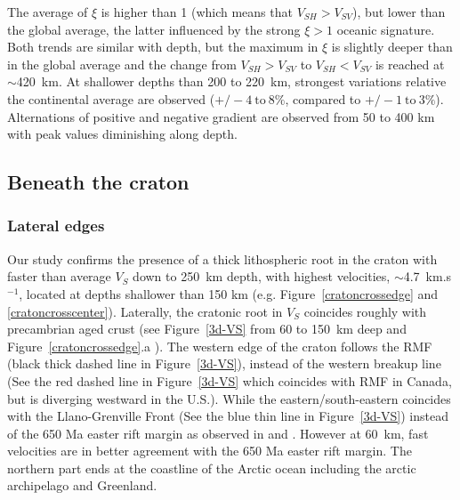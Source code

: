 \documentclass[12pt]{article}
\begin{document}
		The average of $\xi$ is higher than 1 (which means that $V_{SH} > V_{SV}$), but lower than the global average, the latter influenced by the strong $\xi > 1$ oceanic signature. 
		Both trends are similar with depth, but the maximum in $\xi$ is slightly deeper than in the global average and the change from $V_{SH} > V_{SV}$ to $V_{SH} < V_{SV}$ is reached at $\sim$420~km. 
		At shallower depths than 200 to 220~km, strongest variations relative the continental average are observed ($+/- 4 \: \text{to} \: 8 \%$, compared to $+/- 1 \: \text{to} \: 3 \%$). 
		Alternations of positive and negative gradient are observed from 50 to 400 km with peak values diminishing along depth. 


	\subsection{Beneath the craton}

		\subsubsection{Lateral edges}
		Our study confirms the presence of a thick lithospheric root in the craton with faster than average $V_S$ down to 250~km depth, with highest velocities, $\sim$4.7~km.s$^{-1}$, located at depths shallower than  150 km (e.g. Figure~\ref{cratoncrossedge} and \ref{cratoncrosscenter}). 
		Laterally, the cratonic root in $V_S$ coincides roughly with precambrian aged crust (see Figure~\ref{3d-VS} from 60 to 150~km deep and Figure~\ref{cratoncrossedge}.a ).
		The western edge of the craton follows the RMF (black thick dashed line in Figure~\ref{3d-VS}), instead of the western breakup line (See the red dashed line in Figure~\ref{3d-VS} which coincides with RMF in Canada, but is diverging westward in the U.S.). 
		While the eastern/south-eastern coincides with the Llano-Grenville Front (See the blue thin line in Figure~\ref{3d-VS}) instead of the 650 Ma easter rift margin as observed in \cite{yuan2014multiscale} and \cite{schaeffer2014imaging}. 
		However at 60~km, fast velocities are in better agreement with the 650 Ma easter rift margin. 
		The northern part ends at the coastline of the Arctic ocean including the arctic archipelago and Greenland. 
\end{document}
